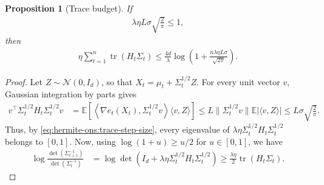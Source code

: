\documentclass{article}
\theoremstyle{plain}
\newtheorem{proposition}[theorem]{Proposition}
\theoremstyle{definition}
\theoremstyle{plain}
\newcommand{\tr}{\operatorname{tr}}
\newcommand{\E}{\mathbb E}
\newcommand{\cN}{\mathcal N}
\begin{document}
\begin{proposition}[Trace budget]
    \label{prop:hermite-ons:trace-budget}
    If
    \begin{align}
        \lambda\eta L\sigma\sqrt{\frac{2}{\pi}}\leq1,
        \label{eq:hermite-ons:trace-step-size}
    \end{align}
    then
    \begin{align}
        \eta\sum_{t=1}^n\tr(H_t\Sigma_t)
        \leq
        \frac{4d}{\lambda}
        \log\left(
        1+\frac{n\lambda\eta L\sigma}{\sqrt{2\pi}}
        \right).
        \label{eq:hermite-ons:trace-budget}
    \end{align}
\end{proposition}
\begin{proof}
    Let $Z\sim\cN(0,I_d)$, so that
    $X_t=\mu_t+\Sigma_t^{1/2}Z$. For every unit vector $v$, Gaussian
    integration by parts gives
    \begin{align}
        v^\top\Sigma_t^{1/2}H_t\Sigma_t^{1/2}v
         & =
        \E\left[
            \left\langle
            \nabla e_t(X_t),\Sigma_t^{1/2}v
            \right\rangle
            \langle v,Z\rangle
            \right]
        \leq
        L\|\Sigma_t^{1/2}v\|
        \E|\langle v,Z\rangle|
        \leq
        L\sigma\sqrt{\frac{2}{\pi}}.
        \label{eq:hermite-ons:normalized-hessian}
    \end{align}
    Thus, by \eqref{eq:hermite-ons:trace-step-size}, every eigenvalue
    of $\lambda\eta \Sigma_t^{1/2}H_t\Sigma_t^{1/2}$ belongs to $[0,1]$.
    Now, using $\log(1+u) \geq u/2$ for $u\in[0,1]$, we have
    \begin{align}
        \log\frac{\det(\Sigma_{t+1}^{-1})}
        {\det(\Sigma_t^{-1})}
         & =
        \log\det\left(
        I_d+\lambda\eta
        \Sigma_t^{1/2}H_t\Sigma_t^{1/2}
        \right) \geq
        \frac{\lambda\eta}{2}\tr(H_t\Sigma_t).
        \label{eq:hermite-ons:trace-logdet-lower}
    \end{align}


\end{proof}
\end{document}
